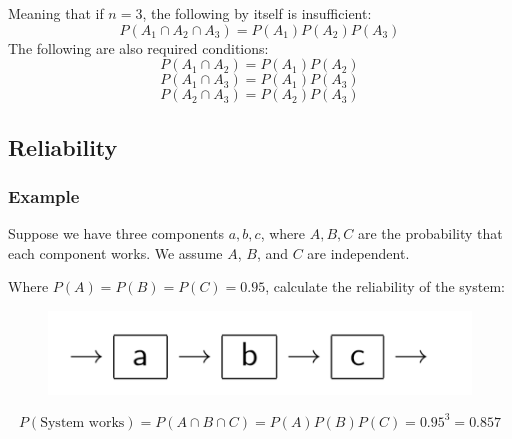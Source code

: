 \documentclass{article}
\begin{document}
Meaning that if $n=3$, the following by itself is insufficient: $$P(A_1 \cap A_2 \cap A_3) = P(A_1) P(A_2) P(A_3)$$ The following are also required conditions: $$P(A_1 \cap A_2 ) = P(A_1) P(A_2)$$ $$P(A_1 \cap A_3) = P(A_1) P(A_3)$$ $$P( A_2 \cap A_3) =  P(A_2) P(A_3)$$

\subsection{Reliability}

\subsubsection*{Example}

Suppose we have three components $a,b,c$, where $A,B,C$ are the probability that each component works. We assume $A$, $B$, and $C$ are independent.

Where $P(A) = P(B) = P(C) = 0.95$, calculate the reliability of the system:

\begin{figure}[ht!]
\centering
\includegraphics[scale=0.5]{Series.png}
\end{figure}
$$P(\text{System works}) = P(A \cap B \cap C) =P(A)P(B)P(C) = 0.95^3 = 0.857$$
\end{document}
